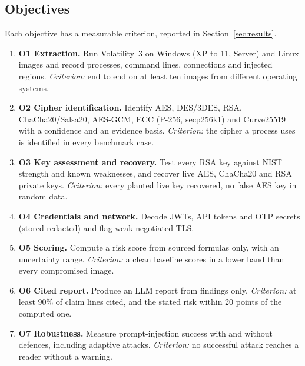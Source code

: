 \subsection{Objectives}
Each objective has a measurable criterion, reported in Section~\ref{sec:results}.
\begin{enumerate}
  \item \textbf{O1 Extraction.} Run Volatility~3 on Windows (XP to 11, Server) and Linux images and record
        processes, command lines, connections and injected regions. \emph{Criterion:} end to end on at least
        ten images from different operating systems.
  \item \textbf{O2 Cipher identification.} Identify AES, DES/3DES, RSA, ChaCha20/Salsa20, AES-GCM, ECC
        (P-256, secp256k1) and Curve25519 with a confidence and an evidence basis. \emph{Criterion:} the cipher a
        process uses is identified in every benchmark case.
  \item \textbf{O3 Key assessment and recovery.} Test every RSA key against NIST strength and known
        weaknesses, and recover live AES, ChaCha20 and RSA private keys. \emph{Criterion:} every planted live
        key recovered, no false AES key in random data.
  \item \textbf{O4 Credentials and network.} Decode JWTs, API tokens and OTP secrets (stored redacted) and flag
        weak negotiated TLS.
  \item \textbf{O5 Scoring.} Compute a risk score from sourced formulas only, with an uncertainty range.
        \emph{Criterion:} a clean baseline scores in a lower band than every compromised image.
  \item \textbf{O6 Cited report.} Produce an LLM report from findings only. \emph{Criterion:} at least 90\% of
        claim lines cited, and the stated risk within 20 points of the computed one.
  \item \textbf{O7 Robustness.} Measure prompt-injection success with and without defences, including adaptive
        attacks. \emph{Criterion:} no successful attack reaches a reader without a warning.
\end{enumerate}

